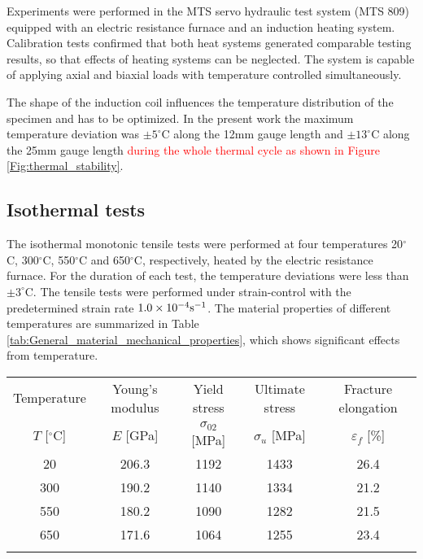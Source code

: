\documentclass[preprint,5p,twocolumn,11pt,sort&compress]{elsarticle}
\newcommand{\marked}[1]{\textcolor{red}{#1}}
\begin{document}
Experiments were performed in the MTS servo hydraulic test system (MTS 809) equipped with  an electric resistance furnace and an induction heating system. Calibration tests confirmed that both heat systems generated comparable testing results, so that effects of heating systems can be neglected. The system is capable of applying axial and biaxial loads with temperature controlled simultaneously.

\begin{figure*}
\caption{\marked{Thermal stability tests. (a) The temperature of three temperature monitor during a testing cycle. (b) Temperature deviation in axial direction.}}
\label{Fig:thermal_stability}
\end{figure*}

The shape of the induction coil influences the temperature distribution of the specimen and has to be optimized. In the present work the maximum temperature deviation was $\pm5^{\circ}$C along the 12mm gauge length and $\pm13^{\circ}$C along the 25mm gauge length \marked{during the whole thermal cycle as shown in Figure \ref{Fig:thermal_stability}}.

\subsection{Isothermal tests}
\noindent
The isothermal monotonic tensile tests were performed at four temperatures 20$^{\circ}$C, 300$^{\circ}$C, 550$^{\circ}$C and 650$^{\circ}$C, respectively, heated by the electric resistance furnace. For the duration of each test, the temperature deviations  were less than $\pm3^{\circ}$C. The tensile tests were performed under strain-control with the predetermined strain rate $1.0\times 10^{-4}\rm{s}^{-1}$.
The material properties of different temperatures are summarized in Table \ref{tab:General_material_mechanical_properties}, which shows significant effects from temperature.

\begin{table*}[htbp]
  \centering
  \caption{Results of isothermal tensile tests.}
    \begin{tabular}{ccccc}
    \hline
    Temperature         & Young's modulus   & Yield stress            & Ultimate stress     & Fracture elongation\\
    $T$ [$^{\circ}$C]   & $E$ [GPa]         & $\sigma_{02}$ [MPa]  & $\sigma_u$ [MPa]    & $\varepsilon_f$ [\%]\\
    \hline
    20    & 206.3 & 1192 & 1433 & 26.4 \\
    300   & 190.2 & 1140 & 1334 & 21.2 \\
    550   & 180.2 & 1090 & 1282 & 21.5 \\
    650   & 171.6 & 1064 & 1255 & 23.4 \\
    \hline \\
    \end{tabular}%
  \label{tab:General_material_mechanical_properties}%
\end{table*}%
\end{document}
